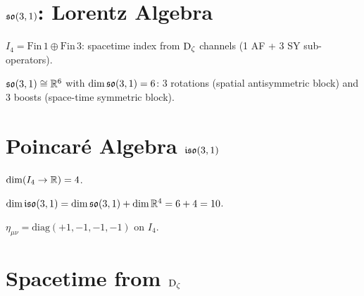 \section{\texorpdfstring{$\so(3,1)$}{so(3,1)}: Lorentz Algebra}

\begin{definition}[$I_4$]
\label{def:I4}
$I_4 = \mathrm{Fin}\,1 \oplus \mathrm{Fin}\,3$: spacetime index from $\operatorname{D_\zeta}$ channels
(1 AF + 3 SY sub-operators).
\end{definition}

\begin{theorem}[$\so(3,1)$ dimension]
\label{thm:so31}
$\mathfrak{so}(3,1) \cong \mathbb{R}^6$ with $\dim\mathfrak{so}(3,1) = 6$:
3 rotations (spatial antisymmetric block) and 3 boosts (space-time symmetric block).
\end{theorem}

\section{\texorpdfstring{Poincar\'{e} Algebra $\mathfrak{iso}(3,1)$}{Poincaré Algebra iso(3,1)}}

\begin{theorem}
\label{thm:finrank-translations}
$\dim(I_4 \to \mathbb{R}) = 4$.
\end{theorem}

\begin{theorem}
\label{thm:finrank-poincare}
$\dim\mathfrak{iso}(3,1) = \dim\mathfrak{so}(3,1) + \dim\mathbb{R}^4 = 6 + 4 = 10$.
\end{theorem}

\begin{definition}
\label{def:minkowski}
$\eta_{\mu\nu} = \mathrm{diag}(+1, -1, -1, -1)$ on $I_4$.
\end{definition}

\section{Spacetime from \texorpdfstring{$\operatorname{D_\zeta}$}{Dζ}}


